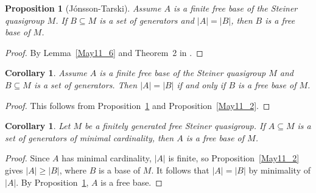 \documentclass[a4paper, 11pt]{article}
\theoremstyle{note}
\newtheorem{prop}[thm]{Proposition}
\newtheorem{cor}[thm]{Corollary}
\begin{document}
	\begin{prop}[Jónsson-Tarski]\label{May11_7} Assume $A$ is a finite free base of the Steiner quasigroup $M$. If $B\subseteq M$ is a set of generators  and $|A|=|B|$, then $B$ is a free base of $M$.
	\end{prop}
	\begin{proof} By Lemma~\ref{May11_6} and Theorem~2 in \cite{jontarski}. 
	\end{proof}
	
	\begin{cor}\label{May11_8}  Assume $A$ is a finite free base of the Steiner quasigroup $M$ and  $B\subseteq M$ is a set of generators. Then $|A|=|B|$ if and only if $B$ is a free base of $M$.
	\end{cor}
	\begin{proof} This follows from Proposition~\ref{May11_7} and Proposition~\ref{May11_2}.
	\end{proof}
	
	\begin{cor}\label{May11_9} Let $M$ be a finitely generated free Steiner quasigroup. If $A \subseteq M$ is a set of generators of minimal cardinality, then $A$ is a free base of $M$. 
	\end{cor}
	\begin{proof} Since $A$ has minimal cardinality, $|A|$ is finite, so Proposition~\ref{May11_2} gives $|A| \geq |B|$, where $B$ is a base of $M$. It follows that $|A|=|B|$ by minimality of $|A|$. By Proposition~\ref{May11_7}, $A$ is a free base.
	\end{proof}
	
\end{document}
